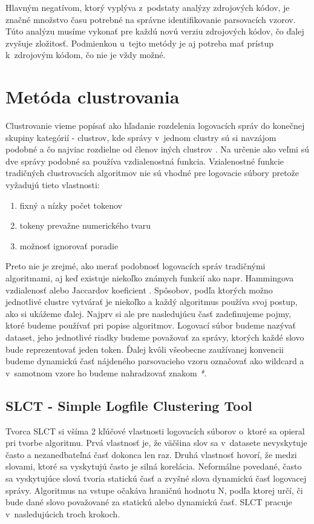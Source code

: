 Hlavným negatívom, ktorý vyplýva z~podstaty analýzy zdrojových kódov, je značné množstvo času potrebné na správne identifikovanie parsovacích vzorov. Túto analýzu musíme vykonať pre každú novú verziu zdrojových kódov, čo ďalej zvyšuje zložitosť. Podmienkou u~tejto metódy je aj potreba mať prístup k~zdrojovým kódom, čo nie je vždy možné. 

\section{ Metóda clustrovania}

Clustrovanie vieme popísať ako hľadanie rozdelenia logovacích správ do konečnej skupiny kategórií - clustrov, kde správy v~jednom clustry sú si navzájom podobné a čo najviac rozdielne od členov iných clustrov  \parencite{iplom} . Na určenie ako veľmi sú dve správy podobné sa používa vzdialenostná funkcia. Vzialenostné funkcie tradičných clustrovacích algoritmov nie sú vhodné pre logovacie súbory pretože vyžadujú tieto vlastnosti:

\begin{enumerate}
  \item fixný a nízky počet tokenov
  \item tokeny prevažne numerického tvaru
  \item možnosť ignorovať poradie
\end{enumerate}

Preto nie je zrejmé, ako merať podobnosť logovacích správ tradičnými algoritmami, aj keď existuje niekoľko známych funkcií ako napr. Hammingova vzdialenosť alebo Jaccardov koeficient \parencite{slct}. Spôsobov, podľa ktorých možno jednotlivé clustre vytvárať je niekoľko a každý algoritmus používa svoj postup, ako si ukážeme ďalej. Najprv si ale pre nasledujúcu časť zadefinujeme pojmy, ktoré budeme používať pri popise algoritmov. Logovací súbor budeme nazývať dataset, jeho jednotlivé riadky budeme považovať za správy, ktorých každé slovo bude reprezentovať jeden token. Ďalej kvôli všeobecne zaužívanej konvencii budeme dynamickú časť nájdeného parsovacieho vzoru označovať ako wildcard a v~samotnom vzore ho budeme nahradzovať znakom \emph{*}.

\subsection{SLCT - Simple Logfile Clustering Tool}
Tvorca SLCT \parencite{slct, slctloghound} si všíma 2 kľúčové vlastnosti logovacích súborov o~ktoré sa opieral pri tvorbe algoritmu. Prvá vlastnosť je, že väčšina slov sa v~datasete nevyskytuje často a nezanedbateľná časť dokonca len raz. Druhá vlastnosť hovorí, že medzi slovami, ktoré sa vyskytujú často je silná korelácia. Neformálne povedané, často sa vyskytujúce slová tvoria statickú časť a zvyšné slova dynamickú časť logovacej správy. Algoritmus na vstupe očakáva hraničnú hodnotu N, podľa ktorej určí, či bude dané slovo považované za statickú alebo dynamickú časť.  SLCT pracuje v~nasledujúcich troch krokoch.

